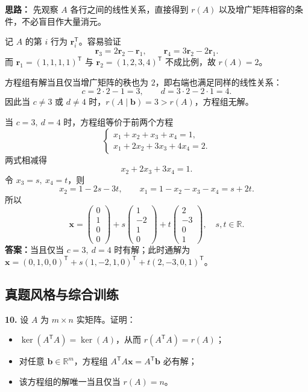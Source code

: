 \ifshowsolutions%
\textbf{思路：} 先观察 \(A\) 各行之间的线性关系，直接得到 \(r(A)\) 以及增广矩阵相容的条件，不必盲目作大量消元。

记 \(A\) 的第 \(i\) 行为 \(\boldsymbol{r}_i^{\mathsf T}\)。容易验证
\[
\boldsymbol{r}_3=2\boldsymbol{r}_2-\boldsymbol{r}_1,\qquad
\boldsymbol{r}_4=3\boldsymbol{r}_2-2\boldsymbol{r}_1.
\]
而 \(\boldsymbol{r}_1=(1,1,1,1)^{\mathsf T}\) 与 \(\boldsymbol{r}_2=(1,2,3,4)^{\mathsf T}\) 不成比例，故 \(r(A)=2\)。

方程组有解当且仅当增广矩阵的秩也为 \(2\)，即右端也满足同样的线性关系：
\[
c=2\cdot2-1=3,\qquad d=3\cdot2-2\cdot1=4.
\]
因此当 \(c\ne3\) 或 \(d\ne4\) 时，\(r(A\mid\boldsymbol{b})=3>r(A)\)，方程组无解。

当 \(c=3,\ d=4\) 时，方程组等价于前两个方程
\[
\begin{cases}
x_1+x_2+x_3+x_4=1,\\
x_1+2x_2+3x_3+4x_4=2.
\end{cases}
\]
两式相减得
\[
x_2+2x_3+3x_4=1.
\]
令 \(x_3=s,\ x_4=t\)，则
\[
x_2=1-2s-3t,\qquad
x_1=1-x_2-x_3-x_4=s+2t.
\]
所以
\[
\boldsymbol{x}=
\begin{pmatrix}0\\1\\0\\0\end{pmatrix}
+s\begin{pmatrix}1\\-2\\1\\0\end{pmatrix}
+t\begin{pmatrix}2\\-3\\0\\1\end{pmatrix},
\quad s,t\in\mathbb R.
\]
\textbf{答案：}当且仅当 $c=3,\ d=4$ 时有解；此时通解为 $\boldsymbol{x}=(0,1,0,0)^{\mathsf T}+s(1,-2,1,0)^{\mathsf T}+t(2,-3,0,1)^{\mathsf T}$。
\else \answerarea[10] \fi%

\subsection{真题风格与综合训练}

\textbf{10.} 设 \(A\) 为 \(m\times n\) 实矩阵。证明：
\begin{itemize}
  \item[(i)] \(\ker(A^{\mathsf T}A)=\ker(A)\)，从而 \(r(A^{\mathsf T}A)=r(A)\)；
  \item[(ii)] 对任意 \(\boldsymbol{b}\in\mathbb R^m\)，方程组 \(A^{\mathsf T}A\boldsymbol{x}=A^{\mathsf T}\boldsymbol{b}\) 必有解；
  \item[(iii)] 该方程组的解唯一当且仅当 \(r(A)=n\)。
\end{itemize}

